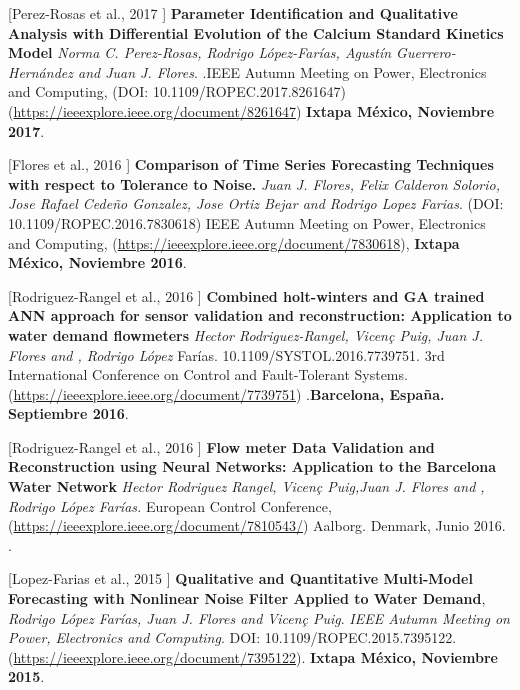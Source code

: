 \begin{innerlist}
\item [[Perez-Rosas et al., 2017]] \textbf{Parameter Identification and Qualitative Analysis with Differential Evolution of the Calcium Standard Kinetics Model} \textit{Norma C. Perez-Rosas, Rodrigo López-Farías, Agustín Guerrero-Hernández and Juan J. Flores}.  .{IEEE Autumn Meeting on Power, Electronics and Computing}, (DOI: 10.1109/ROPEC.2017.8261647) (\url{https://ieeexplore.ieee.org/document/8261647}) \textbf{Ixtapa México, Noviembre 2017}.


\item [[Flores et al., 2016]] \textbf{Comparison of Time Series Forecasting Techniques with respect to Tolerance to Noise.} \textit{Juan J. Flores, Felix Calderon Solorio, Jose Rafael Cede\~no Gonzalez, Jose Ortiz Bejar and Rodrigo Lopez Farias}. (DOI: 10.1109/ROPEC.2016.7830618) {IEEE Autumn Meeting on Power, Electronics and Computing}, (\url{https://ieeexplore.ieee.org/document/7830618}), \textbf{Ixtapa México, Noviembre 2016}.




\item[[Rodriguez-Rangel et al., 2016]] \textbf{Combined holt-winters and GA trained ANN approach for sensor validation and reconstruction: Application to water demand flowmeters} \textit{Hector Rodriguez-Rangel, Vicen\c{c} Puig, Juan J. Flores and ,  Rodrigo López} Farías. 10.1109/SYSTOL.2016.7739751. {3rd International Conference on Control and Fault-Tolerant Systems}.  (\url{https://ieeexplore.ieee.org/document/7739751}) .\textbf{Barcelona, España. Septiembre 2016}.


\item [[Rodriguez-Rangel et al., 2016]] \textbf{Flow meter Data Validation and Reconstruction using Neural Networks: Application to the Barcelona Water Network} \textit{Hector Rodriguez Rangel, Vicen\c{c} Puig,Juan J. Flores and ,  Rodrigo López Farías.} European Control Conference, (\url{https://ieeexplore.ieee.org/document/7810543/}) Aalborg. Denmark, Junio 2016. .

\item [[Lopez-Farias et al., 2015]] \textbf{Qualitative and Quantitative Multi-Model Forecasting with Nonlinear Noise Filter Applied to Water Demand}, \textit{Rodrigo López Farías, Juan J. Flores and Vicen\c{c} Puig}.   \textit{IEEE Autumn Meeting on Power, Electronics and Computing}. DOI: 10.1109/ROPEC.2015.7395122. (\url{https://ieeexplore.ieee.org/document/7395122}). \textbf{Ixtapa México, Noviembre 2015}.


\end{innerlist}
